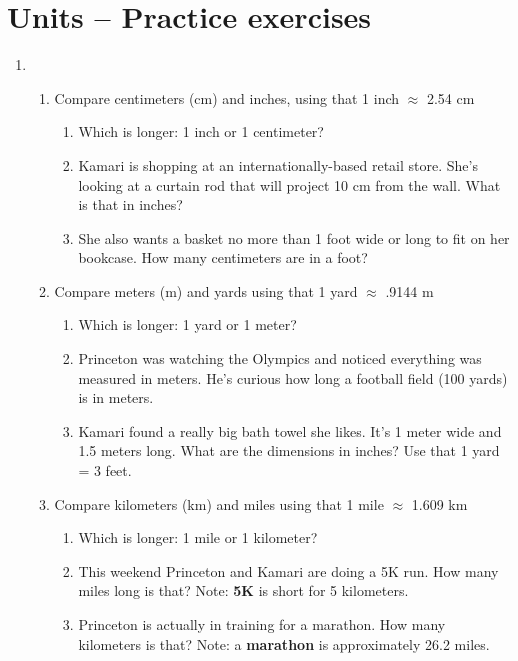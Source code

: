 \section{Units  -- Practice exercises}

\begin{enumerate}
\item  
\begin{enumerate}

\item Compare centimeters (cm) and inches, using that 1 inch $\approx$ 2.54 cm
\begin{enumerate}
\item Which is longer:  1 inch or 1 centimeter? \vfill
\item Kamari is shopping at an internationally-based retail store. She's looking at a curtain rod that will project 10 cm from the wall.  What is that in inches?  \vfill
\item She also wants a basket no more than 1 foot wide or long to fit on her bookcase.  How many centimeters are in a foot? \vfill
\end{enumerate}

\item Compare meters (m) and yards using that 1 yard $\approx$ .9144 m
\begin{enumerate}
\item Which is longer: 1 yard or 1 meter? \vfill
\item Princeton was watching the Olympics and noticed everything was measured in meters.  He's curious how long a football field (100 yards) is in meters.  \vfill
\item Kamari found a really big bath towel she likes. It's 1 meter wide and 1.5 meters long.  What are the dimensions in inches?  Use that 1 yard = 3 feet.  \vfill
\end{enumerate}

\item Compare kilometers (km) and miles using that 1 mile $\approx$ 1.609 km
\begin{enumerate}
\item Which is longer:  1 mile or 1 kilometer? \vfill
\item This weekend Princeton and Kamari are doing a 5K run.  How many miles long is that?  Note:  \textbf{5K} is short for 5 kilometers.  \vfill
\item  Princeton is actually in training for a marathon.  How many kilometers is that?  Note: a \textbf{marathon} is approximately 26.2 miles. \vfill
\end{enumerate}


\end{enumerate}
\end{enumerate}
